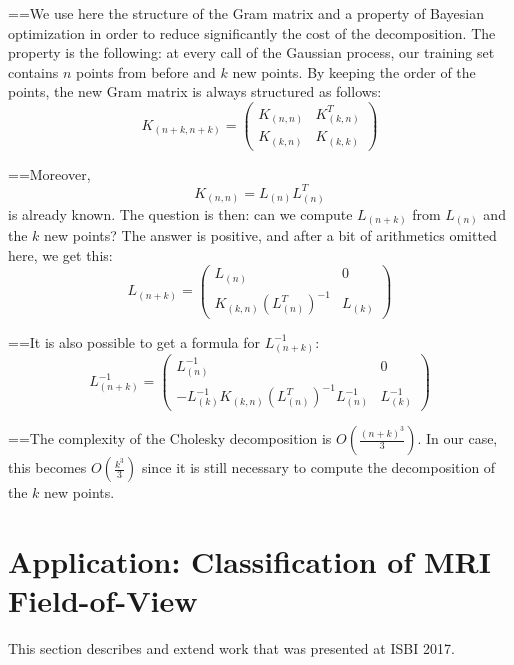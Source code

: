 ==We use here the structure of the Gram matrix and a property of Bayesian optimization in order to reduce significantly the cost of the decomposition. The property is the following: at every call of the Gaussian process, our training set contains $n$ points from before and $k$ new points. By keeping the order of the points, the new Gram matrix is always structured as follows:
\begin{equation}
	K_{(n+k,n+k)} = 
    \begin{pmatrix}
    K_{(n,n)} & K_{(k,n)}^T \\
    K_{(k,n)} & K_{(k,k)}
  \end{pmatrix}
\end{equation}

==Moreover,
\begin{equation}
	 K_{(n,n)} = L_{(n)} L_{(n)}^T
\end{equation}
is already known. The question is then: can we compute $L_{(n+k)}$ from $L_{(n)}$ and the $k$ new points? The answer is positive, and after a bit of arithmetics omitted here, we get this:
\begin{equation}
  L_{(n+k)} = 
  \begin{pmatrix}
    L_{(n)} & 0 \\
    K_{(k,n)} (L_{(n)}^T)^{-1} & L_{(k)}
  \end{pmatrix}
\end{equation}

==It is also possible to get a formula for $ L_{(n+k)}^{-1}$:
\begin{equation}
  L_{(n+k)}^{-1} =
  \begin{pmatrix}
    L_{(n)}^{-1} & 0 \\
    - L_{(k)}^{-1} K_{(k,n)} (L_{(n)}^T)^{-1} L_{(n)}^{-1} & L_{(k)}^{-1}
  \end{pmatrix}
\end{equation}

==The complexity of the Cholesky decomposition is $O\left(\frac{(n+k)^3}{3}\right)$. In our case, this becomes $O\left(\frac{k^3}{3}\right)$ since it is still necessary to compute the decomposition of the $k$ new points.

\section{Application: Classification of MRI Field-of-View}

This section describes and extend work that was presented at ISBI 2017.

